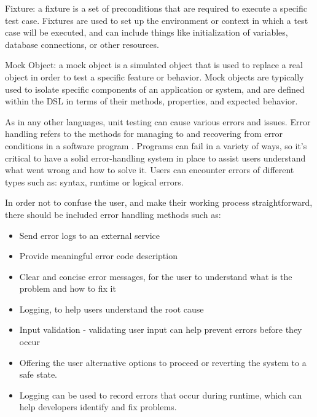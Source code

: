 Fixture: a fixture is a set of preconditions that are required to execute a specific test case. Fixtures are used to set up the environment or context in which a test case will be executed, and can include things like initialization of variables, database connections, or other resources.

Mock Object: a mock object is a simulated object that is used to replace a real object in order to test a specific feature or behavior. Mock objects are typically used to isolate specific components of an application or system, and are defined within the DSL in terms of their methods, properties, and expected behavior.

As in any other languages, unit testing can cause various errors and issues. Error handling refers to the methods for managing to and recovering from error conditions in a software program \cite{mozaicworks}. Programs can fail in a variety of ways, so it's critical to have a solid error-handling system in place to assist users understand what went wrong and how to solve it. Users can encounter errors of different types such as: syntax, runtime or logical errors.

In order not to confuse the user, and make their working process straightforward, there should be included error handling methods such as:
\begin{itemize}
    \item Send error logs to an external service
    \item Provide meaningful error code description
    \item  Clear and concise error messages, for the user to understand what is the problem and how to fix it
    \item Logging, to help users understand the root cause
    \item Input validation - validating user input can help prevent errors before they occur
    \item  Offering the user alternative options to proceed or reverting the system to a safe state.
    \item  Logging can be used to record errors that occur during runtime, which can help developers identify and fix problems.
    
\end{itemize}

